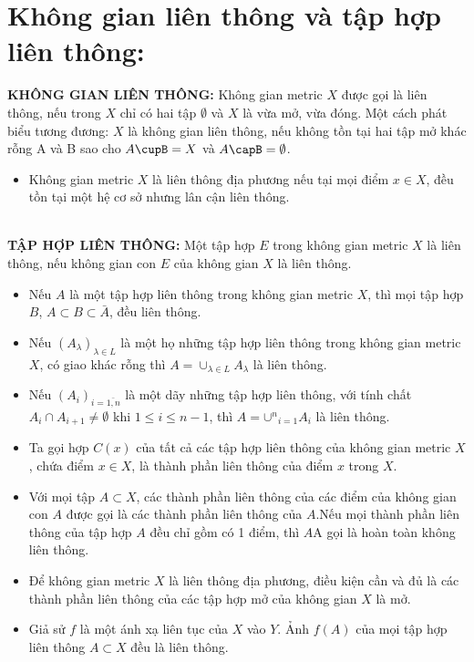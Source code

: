 \documentclass[12pt,a4paper]{article}
\begin{document}
\section{Không gian liên thông và tập hợp liên thông:}
\hspace{0.7cm}\textbf{KHÔNG GIAN LIÊN THÔNG:} Không gian metric $X$ được gọi là {\color{red}liên thông}, nếu trong $X$ chỉ có hai tập $\emptyset$ và $X$ là vừa mở, vừa đóng. Một cách phát biểu tương đương: $X$ là không gian liên thông, nếu không tồn tại hai tập mở khác rỗng  A và B sao cho $A\cupB = X$ và $A\capB = \emptyset$. \\
\begin{itemize}
\item Không gian metric $X$ là {\color{red}liên thông địa phương} nếu tại mọi điểm $x \in X$, đều tồn tại một hệ cơ sở nhưng lân cận liên thông.
\end{itemize}\\
\pagebreak
\hspace{0.7cm}\textbf{TẬP HỢP LIÊN THÔNG:} Một tập hợp $E$ trong không gian metric $X$ là liên thông, nếu không gian con $E$ của không gian $X$ là liên thông.\\
\begin{itemize}
\item Nếu $A$ là một tập hợp liên thông trong không gian metric $X$, thì mọi tập hợp $B$, $A \subset B \subset \bar{A}$, đều liên thông.\\
\item Nếu $(A_{\lambda})_{\lambda \in L} $ là một họ những tập hợp liên thông trong không gian metric $X$, có giao khác rỗng thì $A = \cup_{\lambda \in L} A_{\lambda} $ là liên thông.\\
\item Nếu $(A_i)_{i = \bar{1,n}}$ là một dãy những tập hợp liên thông, với tính chất $A_i \cap A_{i+1} \neq \emptyset$ khi $1 \leqslant i \leqslant n-1$, thì $A = \cup{^n}_{i = 1} A_i$ là liên thông.\\
\item Ta gọi hợp $C(x)$ của tất cả các tập hợp liên thông của không gian metric $X$, chứa điểm $x \in X$, là {\color{red}thành phần liên thông} của điểm $x$ trong $X$.\\
\item Với mọi tập $A \subset X$, các thành phần liên thông của các điểm của không gian con $A$ được gọi là {\color{red}các thành phần liên thông} của $A$.Nếu mọi thành phần liên thông của tập hợp $A$ đều chỉ gồm có 1 điểm, thì $A$A gọi là {\color{red}hoàn toàn không liên thông}.\\
\item Để không gian metric $X$ là liên thông địa phương, điều kiện cần và đủ là các thành phần liên thông của các tập hợp mở của không gian $X$ là mở.\\
\item Giả sử $f$ là một ánh xạ liên tục của $X$ vào $Y$. Ảnh $f(A)$ của mọi tập hợp liên thông $A \subset X$ đều là liên thông.
\end{itemize}
\end{document}

